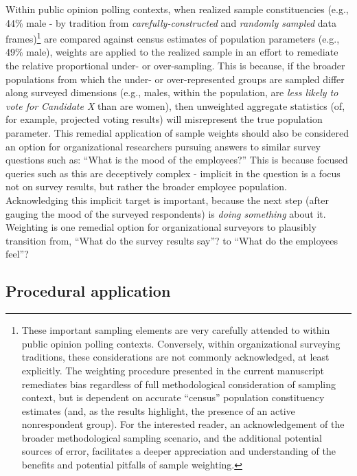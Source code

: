 \documentclass[
  man,floatsintext]{apa7}
\begin{document}
Within public opinion polling contexts, when realized sample constituencies (e.g., 44\% male - by tradition from \emph{carefully-constructed} and \emph{randomly sampled} data frames)\footnote{These important sampling elements are very carefully attended to within public opinion polling contexts. Conversely, within organizational surveying traditions, these considerations are not commonly acknowledged, at least explicitly. The weighting procedure presented in the current manuscript remediates bias regardless of full methodological consideration of sampling context, but is dependent on accurate ``census'' population constituency estimates (and, as the results highlight, the presence of an active nonrespondent group). For the interested reader, an acknowledgement of the broader methodological sampling scenario, and the additional potential sources of error, facilitates a deeper appreciation and understanding of the benefits and potential pitfalls of sample weighting.} are compared against census estimates of population parameters (e.g., 49\% male), weights are applied to the realized sample in an effort to remediate the relative proportional under- or over-sampling. This is because, if the broader populations from which the under- or over-represented groups are sampled differ along surveyed dimensions (e.g., males, within the population, are \emph{less likely to vote for Candidate X} than are women), then unweighted aggregate statistics (of, for example, projected voting results) will misrepresent the true population parameter. This remedial application of sample weights should also be considered an option for organizational researchers pursuing answers to similar survey questions such as: ``What is the mood of the employees?'' This is because focused queries such as this are deceptively complex - implicit in the question is a focus not on survey results, but rather the broader employee population. Acknowledging this implicit target is important, because the next step (after gauging the mood of the surveyed respondents) is \emph{doing something} about it. Weighting is one remedial option for organizational surveyors to plausibly transition from, ``What do the survey results say''? to ``What do the employees feel''?

\hypertarget{procedural-application}{%
\subsection{Procedural application}\label{procedural-application}}
\end{document}
